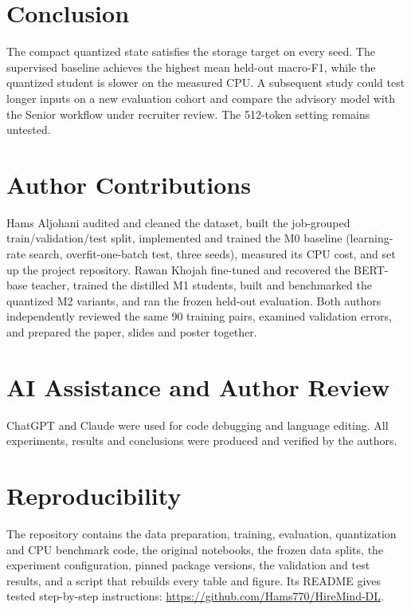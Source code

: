 \documentclass[11pt]{article}
\begin{document}
\section{Conclusion}
The compact quantized state satisfies the storage target on every seed. The supervised baseline achieves the highest mean held-out macro-F1, while the quantized student is slower on the measured CPU. A subsequent study could test longer inputs on a new evaluation cohort and compare the advisory model with the Senior workflow under recruiter review. The 512-token setting remains untested.
\section*{Author Contributions}
Hams Aljohani audited and cleaned the dataset, built the job-grouped train/validation/test split, implemented and trained the M0 baseline (learning-rate search, overfit-one-batch test, three seeds), measured its CPU cost, and set up the project repository.
Rawan Khojah fine-tuned and recovered the BERT-base teacher, trained the distilled M1 students, built and benchmarked the quantized M2 variants, and ran the frozen held-out evaluation.
Both authors independently reviewed the same 90 training pairs, examined validation errors, and prepared the paper, slides and poster together.

\section*{AI Assistance and Author Review}
ChatGPT and Claude were used for code debugging and language editing. All experiments, results and conclusions were produced and verified by the authors.

\section*{Reproducibility}
The repository contains the data preparation, training, evaluation, quantization and CPU benchmark code, the original notebooks, the frozen data splits, the experiment configuration, pinned package versions, the validation and test results, and a script that rebuilds every table and figure. Its README gives tested step-by-step instructions: \url{https://github.com/Hams770/HireMind-DL}.
\end{document}
